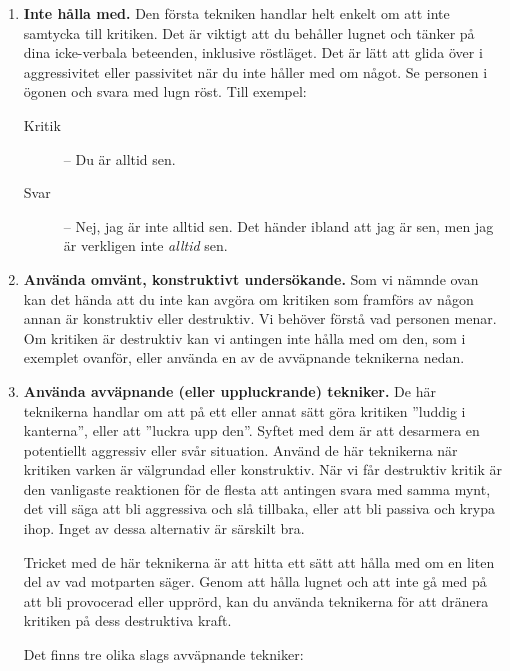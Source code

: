 \documentclass[swedish,a4paper]{book}
\begin{document}
\begin{enumerate}

\item \textbf{Inte hålla med.} Den första tekniken handlar helt enkelt om att inte samtycka till kritiken. Det är viktigt att du behåller lugnet och tänker på dina icke-verbala beteenden, inklusive röstläget. Det är lätt att glida över i aggressivitet eller passivitet när du inte håller med om något. Se personen i ögonen och svara med lugn röst. Till exempel:

\begin{description}

\item[Kritik] -- Du är alltid sen.

\item[Svar] -- Nej, jag är inte alltid sen. Det händer ibland att jag är sen, men jag är verkligen inte \textit{alltid} sen.

\end{description}

\item \textbf{Använda omvänt, konstruktivt undersökande.} Som vi nämnde ovan kan det hända att du inte kan avgöra om kritiken som framförs av någon annan är konstruktiv eller destruktiv. Vi behöver förstå vad personen menar. Om kritiken är destruktiv kan vi antingen inte hålla med om den, som i exemplet ovanför, eller använda en av de avväpnande teknikerna nedan.

\item \textbf{Använda avväpnande (eller uppluckrande) tekniker.} De här teknikerna handlar om att på ett eller annat sätt göra kritiken ''luddig i kanterna'', eller att ''luckra upp den''. Syftet med dem är att desarmera en potentiellt aggressiv eller svår situation. Använd de här teknikerna när kritiken varken är välgrundad eller konstruktiv. När vi får destruktiv kritik är den vanligaste reaktionen för de flesta att antingen svara med samma mynt, det vill säga att bli aggressiva och slå tillbaka, eller att bli passiva och krypa ihop. Inget av dessa alternativ är särskilt bra.

Tricket med de här teknikerna är att hitta ett sätt att hålla med om en liten del av vad motparten säger. Genom att hålla lugnet och att inte gå med på att bli provocerad eller upprörd, kan du använda teknikerna för att dränera kritiken på dess destruktiva kraft.

Det finns tre olika slags avväpnande tekniker:

\begin{enumerate}


\end{enumerate}
\end{enumerate}
\end{document}
